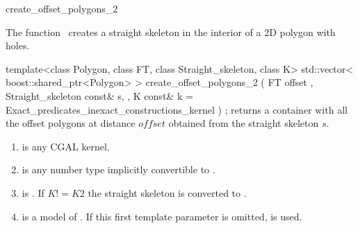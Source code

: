 

\begin{ccRefFunction}{create_offset_polygons_2}


\ccDefinition

The function \ccRefName\ creates a straight skeleton in the interior of a 2D polygon with holes.


\ccFunction
{template<class Polygon, class FT, class Straight_skeleton, class K>
std::vector< boost::shared_ptr<Polygon> >
create_offset_polygons_2 ( FT                       offset
                         , Straight_skeleton const& s,
                         , K const&                 k = Exact_predicates_inexact_constructions_kernel
                         ) ;
}
{returns a container with all the offset polygons at distance $offset$ obtained from 
the straight skeleton $s$. 
}


\begin{enumerate}  
   \item    {} is any CGAL kernel.
   \item    {} is any number type implicitly convertible to .
   \item    {} is . 
            If $K != K2$ the straight skeleton is converted to .
   \item    {} is a model of . 
            If this first template parameter is omitted,  is used.
\end{enumerate}


\ccSeeAlso
{}\\
\\
\\
\\

\end{ccRefFunction}


